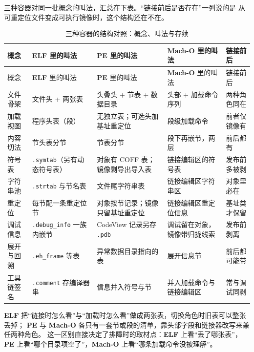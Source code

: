 \documentclass[12pt,a4paper,fontset=fandol]{ctexbook}
\newcommand{\Tp}[1]{\texttt{#1}}
\newcommand{\Sect}[1]{\texttt{.#1}}
\newcommand{\Elf}{\textbf{\textsf{ELF}}}
\newcommand{\PeFmt}{\textbf{\textsf{PE}}}
\newcommand{\Macho}{\textbf{\textsf{Mach-O}}}
\begin{document}
三种容器对同一批概念的叫法，汇总在下表。“链接前后是否存在”一列说的是
从可重定位文件变成可执行镜像时，这个结构还在不在。

\begin{longtable}{@{}>{\raggedright\arraybackslash}p{} >{\raggedright\arraybackslash}p{} >{\raggedright\arraybackslash}p{} >{\raggedright\arraybackslash}p{} >{\raggedright\arraybackslash}p{}@{}}
\caption{三种容器的结构对照：概念、叫法与存续}\label{tab:cl07-containers}\\
\toprule
概念 & \Elf{} 里的叫法 & \PeFmt{} 里的叫法 & \Macho{} 里的叫法 & 链接前后 \\
\midrule
\endfirsthead
\toprule
概念 & \Elf{} 里的叫法 & \PeFmt{} 里的叫法 & \Macho{} 里的叫法 & 链接前后 \\
\midrule
\endhead
\bottomrule
\endfoot
文件骨架 & 文件头 + 两张表 & 头叠头 + 节表 + 数据目录 & 头部 + 加载命令序列 & 两种角色同在 \\
加载视图 & 程序头表（段） & 无独立表；可选头加基址重定位 & 段级加载命令 & 前者仅镜像有 \\
内容切法 & 节头表分节 & 节表分节 & 段下再嵌节，两层 & 前后都有 \\
符号表 & \Sect{symtab}（另有动态符号表） & 对象有 COFF 表；镜像剩导出导入表 & 链接编辑区的符号表 & 发布前多被剥 \\
字符串池 & \Sect{strtab} 与节名表 & 文件尾字符串表 & 链接编辑区字符串区 & 对象里必在 \\
重定位 & 每节配一条重定位节 & 对象按节记录；镜像只留基址重定位 & 链接编辑区重定位信息 & 基址类才保留 \\
调试信息 & \Sect{debug\_info} 一族内嵌节 & CodeView 记录另存 \Tp{.pdb} & 调试留在对象，镜像带归拢线索 & 发布前剥离 \\
展开与回溯 & \Sect{eh\_frame} 等表 & 异常数据目录指向的表 & 展开信息节 & 前后都可能带 \\
工具链签名 & \Sect{comment} 存编译器串 & 信息并入符号与节 & 并入加载命令与链接编辑区 & 常与调试同剥 \\
\end{longtable}

\begin{compare}[title={一张表还是两张表}]
\Elf{} 把“链接时怎么看”与“加载时怎么看”做成两张表，切换角色时旧表可以整张丢掉；
\PeFmt{} 与 \Macho{} 各只有一套节或段的清单，靠头部字段和链接器改写来兼任两种角色。
这一区别直接决定了排障时的取材点：\Elf{} 上看“丢了哪张表”，
\PeFmt{} 上看“哪个目录项空了”，\Macho{} 上看“哪条加载命令没被理解”。
\end{compare}
\end{document}
